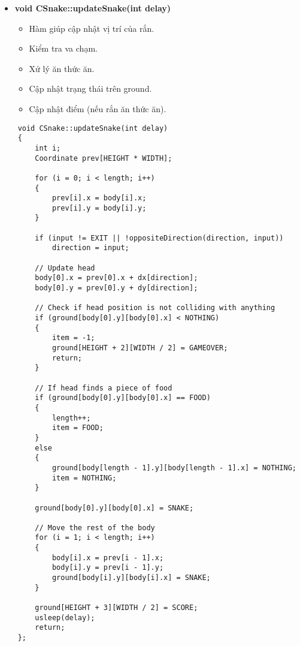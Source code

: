 \documentclass[a4paper, 12pt]{article}
\begin{document}
\begin{center}
    \begin{itemize}
        \item \textbf{void CSnake::updateSnake(int delay)}
        \begin{itemize}
            \item Hàm giúp cập nhật vị trí của rắn.
            \item Kiểm tra va chạm.
            \item Xử lý ăn thức ăn.
            \item Cập nhật trạng thái trên ground.
            \item Cập nhật điểm (nếu rắn ăn thức ăn).
        \end{itemize}
    \end{itemize}
    
    \begin{lstlisting}
    void CSnake::updateSnake(int delay)
    {
        int i;
        Coordinate prev[HEIGHT * WIDTH];
    
        for (i = 0; i < length; i++)
        {
            prev[i].x = body[i].x;
            prev[i].y = body[i].y;
        }
    
        if (input != EXIT || !oppositeDirection(direction, input))
            direction = input;
    
        // Update head
        body[0].x = prev[0].x + dx[direction];
        body[0].y = prev[0].y + dy[direction];
    
        // Check if head position is not colliding with anything
        if (ground[body[0].y][body[0].x] < NOTHING)
        {
            item = -1;
            ground[HEIGHT + 2][WIDTH / 2] = GAMEOVER;
            return;
        }
    
        // If head finds a piece of food
        if (ground[body[0].y][body[0].x] == FOOD)
        {
            length++;
            item = FOOD;
        }
        else
        {
            ground[body[length - 1].y][body[length - 1].x] = NOTHING;
            item = NOTHING;
        }
    
        ground[body[0].y][body[0].x] = SNAKE;
    
        // Move the rest of the body
        for (i = 1; i < length; i++)
        {
            body[i].x = prev[i - 1].x;
            body[i].y = prev[i - 1].y;
            ground[body[i].y][body[i].x] = SNAKE;
        }
    
        ground[HEIGHT + 3][WIDTH / 2] = SCORE;
        usleep(delay);
        return;
    };
    \end{lstlisting}
\end{center}
\end{document}
